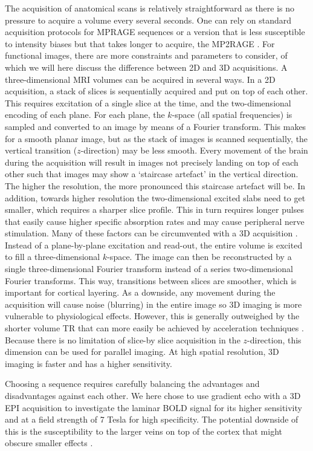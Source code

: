 The acquisition of anatomical scans is relatively straightforward as there is no pressure to acquire a volume every several seconds. One can rely on standard acquisition protocols for MPRAGE sequences \cite{Mugler1990} or a version that is less susceptible to intensity biases but that takes longer to acquire, the MP2RAGE \cite{Marques2010}. For functional images, there are more constraints and parameters to consider, of which we will here discuss the difference between 2D and 3D acquisitions. A three-dimensional MRI volumes can be acquired in several ways. In a 2D acquisition, a stack of slices is sequentially acquired and put on top of each other. This requires excitation of a single slice at the time, and the two-dimensional encoding of each plane. For each plane, the $k$-space (all spatial frequencies) is sampled and converted to an image by means of a Fourier transform. This makes for a smooth planar image, but as the stack of images is scanned sequentially, the vertical transition ($z$-direction) may be less smooth. Every movement of the brain during the acquisition will result in images not precisely landing on top of each other such that images may show a `staircase artefact' in the vertical direction. The higher the resolution, the more pronounced this staircase artefact will be. In addition, towards higher resolution the two-dimensional excited slabs need to get smaller, which requires a sharper slice profile. This in turn requires longer pulses that easily cause higher specific absorption rates and may cause peripheral nerve stimulation. Many of these factors can be circumvented with a 3D acquisition \cite{Poser2010}. Instead of a plane-by-plane excitation and read-out, the entire volume is excited \cite{Song1994} to fill a three-dimensional $k$-space. The image can then be reconstructed by a single three-dimensional Fourier transform instead of a series two-dimensional Fourier transforms. This way, transitions between slices are smoother, which is important for cortical layering. As a downside, any movement during the acquisition will cause noise (blurring) in the entire image so 3D imaging is more vulnerable to physiological effects. However, this is generally outweighed by the shorter volume TR that can more easily be achieved by acceleration techniques \cite{Poser2010}. Because there is no limitation of slice-by slice acquisition in the $z$-direction, this dimension can be used for parallel imaging. At high spatial resolution, 3D imaging is faster and has a higher sensitivity.

Choosing a sequence requires carefully balancing the advantages and disadvantages against each other. We here chose to use gradient echo with a 3D EPI acquisition to investigate the laminar BOLD signal for its higher sensitivity and at a field strength of 7 Tesla for high specificity. The potential downside of this is the susceptibility to the larger veins on top of the cortex that might obscure smaller effects \cite{Barth2007}.

